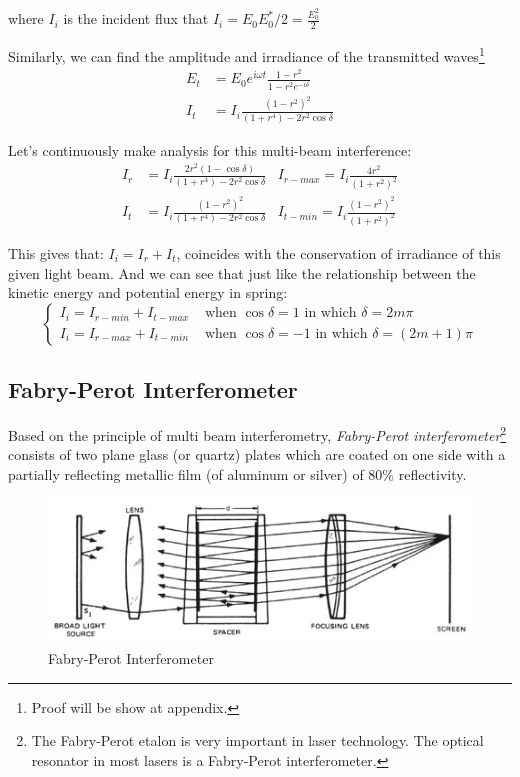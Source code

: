 \documentclass[UTF8]{book}
\begin{document}
where $I_i$ is the incident flux that $I_i=E_0E_0^*/2=\frac{E_0^2}{2}$

Similarly, we can find the amplitude and irradiance of the transmitted waves\footnote{Proof will be show at appendix.}
\begin{align*}
E_t&=E_0e^{i\omega t}\frac{1-r^2}{1-r^2e^{-i\delta }}\\
I_t&=I_i\frac{(1-r^2)^2}{(1+r^4)-2r^2\cos \delta}
\end{align*}

Let's continuously make analysis for this multi-beam interference:
\begin{align*}
I_r&=I_i\frac{2r^2(1-\cos \delta)}{(1+r^4)-2r^2\cos \delta}&I_{r-max}=I_i\frac{4r^2}{(1+r^2)^2}\\
I_t&=I_i\frac{(1-r^2)^2}{(1+r^4)-2r^2\cos \delta}&I_{t-min}=I_i\frac{(1-r^2)^2}{(1+r^2)^2}
\end{align*}

This gives that: $I_i=I_r+I_t$, coincides with the conservation of irradiance of this given light beam. And we can see that just like the relationship between the kinetic energy and potential energy in spring:
\[\begin{cases}
I_i=I_{r-min}+I_{t-max} &\textrm{ when }\cos \delta =1\textrm{ in which }\delta =2m\pi\\
I_i=I_{r-max}+I_{t-min} &\textrm{ when }\cos \delta =-1\textrm{ in which }\delta =(2m+1)\pi 
\end{cases}\]



\subsection{Fabry-Perot Interferometer}
Based on the principle of multi beam interferometry, \emph{Fabry-Perot interferometer}\footnote{The Fabry-Perot etalon is very important in laser technology. The optical resonator in most lasers is a Fabry-Perot interferometer.} consists of two plane glass (or quartz) plates which are coated on one side with a partially reflecting metallic film (of aluminum or silver) of $80\%$ reflectivity.
\begin{figure}[H]
\centering
\label{fig:Fabry-Perot Interferometer}
\includegraphics[scale=0.8]{Figure/FIG2.JPG}
\caption{Fabry-Perot Interferometer}
\end{figure}
\end{document}
